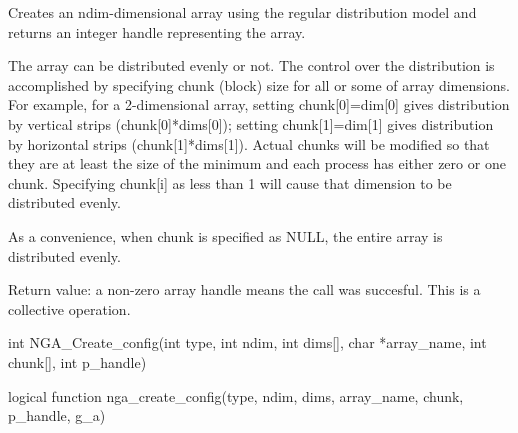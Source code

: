 \documentclass[12pt]{article}
\begin{document}
\begin{desc}

  Creates an ndim-dimensional array using the regular distribution
  model and returns an integer handle representing the array.

  The array can be distributed evenly or not. The control over the
  distribution is accomplished by specifying chunk (block) size for
  all or some of array dimensions. For example, for a 2-dimensional
  array, setting chunk[0]=dim[0] gives distribution by vertical strips
  (chunk[0]*dims[0]); setting chunk[1]=dim[1] gives distribution by
  horizontal strips (chunk[1]*dims[1]). Actual chunks will be modified
  so that they are at least the size of the minimum and each process
  has either zero or one chunk. Specifying chunk[i] as less than 1 will cause
  that dimension to be distributed evenly.

  As a convenience, when chunk is specified as NULL, the entire array
  is distributed evenly.

  Return value: a non-zero array handle means the call was succesful.
  This is a collective operation.
\end{desc}



\begin{capi}
\begin{ccode}
int NGA_Create_config(int type, int ndim, int dims[], char *array_name,
                      int chunk[], int p_handle)
\end{ccode}
\begin{funcargs}
\end{funcargs}
\end{capi}

\begin{fapi}
\begin{fcode}
logical function nga_create_config(type, ndim, dims, array_name, chunk,
                                   p_handle, g_a)
\end{fcode}
\begin{funcargs}
\end{funcargs}
\end{fapi}
\end{document}
